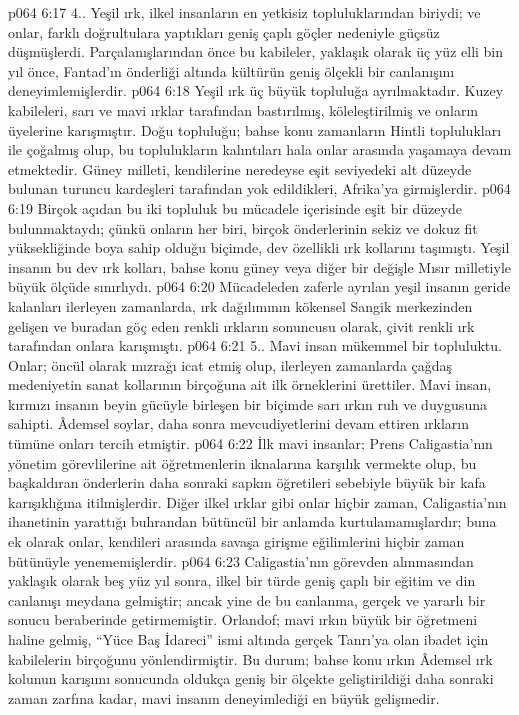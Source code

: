 \vs p064 6:17 4.\bibnobreakspace {}. Yeşil ırk, ilkel insanların en yetkisiz topluluklarından biriydi; ve onlar, farklı doğrultulara yaptıkları geniş çaplı göçler nedeniyle güçsüz düşmüşlerdi. Parçalanışlarından önce bu kabileler, yaklaşık olarak üç yüz elli bin yıl önce, Fantad’ın önderliği altında kültürün geniş ölçekli bir canlanışını deneyimlemişlerdir.
\vs p064 6:18 Yeşil ırk üç büyük topluluğa ayrılmaktadır. Kuzey kabileleri, sarı ve mavi ırklar tarafından bastırılmış, köleleştirilmiş ve onların üyelerine karışmıştır. Doğu topluluğu; bahse konu zamanların Hintli toplulukları ile çoğalmış olup, bu toplulukların kalıntıları hala onlar arasında yaşamaya devam etmektedir. Güney milleti, kendilerine neredeyse eşit seviyedeki alt düzeyde bulunan turuncu kardeşleri tarafından yok edildikleri, Afrika’ya girmişlerdir.
\vs p064 6:19 Birçok açıdan bu iki topluluk bu mücadele içerisinde eşit bir düzeyde bulunmaktaydı; çünkü onların her biri, birçok önderlerinin sekiz ve dokuz fit yüksekliğinde boya sahip olduğu biçimde, dev özellikli ırk kollarını taşımıştı. Yeşil insanın bu dev ırk kolları, bahse konu güney veya diğer bir değişle Mısır milletiyle büyük ölçüde sınırlıydı.
\vs p064 6:20 Mücadeleden zaferle ayrılan yeşil insanın geride kalanları ilerleyen zamanlarda, ırk dağılımının kökensel Sangik merkezinden gelişen ve buradan göç eden renkli ırkların sonuncusu olarak, çivit renkli ırk tarafından onlara karışmıştı.
\vs p064 6:21 5.\bibnobreakspace {}. Mavi insan mükemmel bir topluluktu. Onlar; öncül olarak mızrağı icat etmiş olup, ilerleyen zamanlarda çağdaş medeniyetin sanat kollarının birçoğuna ait ilk örneklerini ürettiler. Mavi insan, kırmızı insanın beyin gücüyle birleşen bir biçimde sarı ırkın ruh ve duygusuna sahipti. Âdemsel soylar, daha sonra mevcudiyetlerini devam ettiren ırkların tümüne onları tercih etmiştir.
\vs p064 6:22 İlk mavi insanlar; Prens Caligastia’nın yönetim görevlilerine ait öğretmenlerin iknalarına karşılık vermekte olup, bu başkaldıran önderlerin daha sonraki sapkın öğretileri sebebiyle büyük bir kafa karışıklığına itilmişlerdir. Diğer ilkel ırklar gibi onlar hiçbir zaman, Caligastia’nın ihanetinin yarattığı buhrandan bütüncül bir anlamda kurtulamamışlardır; buna ek olarak onlar, kendileri arasında savaşa girişme eğilimlerini hiçbir zaman bütünüyle yenememişlerdir.
\vs p064 6:23 Caligastia’nın görevden alınmasından yaklaşık olarak beş yüz yıl sonra, ilkel bir türde geniş çaplı bir eğitim ve din canlanışı meydana gelmiştir; ancak yine de bu canlanma, gerçek ve yararlı bir sonucu beraberinde getirmemiştir. Orlandof; mavi ırkın büyük bir öğretmeni haline gelmiş, “Yüce Baş İdareci” ismi altında gerçek Tanrı’ya olan ibadet için kabilelerin birçoğunu yönlendirmiştir. Bu durum; bahse konu ırkın Âdemsel ırk kolunun karışımı sonucunda oldukça geniş bir ölçekte geliştirildiği daha sonraki zaman zarfına kadar, mavi insanın deneyimlediği en büyük gelişmedir.
